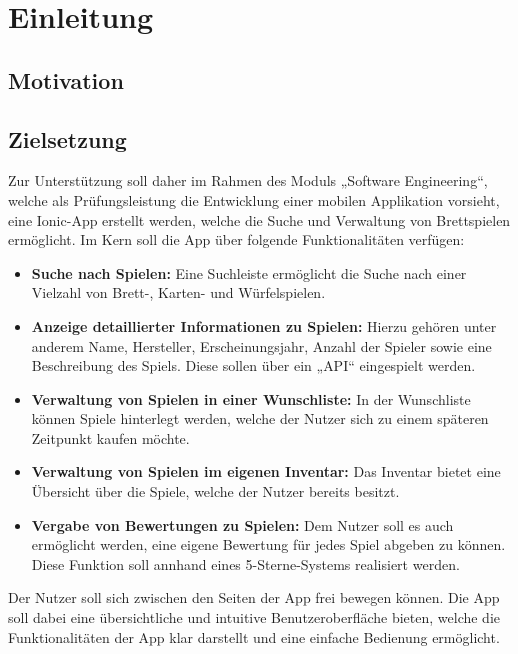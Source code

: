 \chapter{Einleitung}
\section{Motivation}

\section{Zielsetzung}
Zur Unterstützung soll daher im Rahmen des Moduls „Software Engineering“, welche als Prüfungsleistung die Entwicklung einer mobilen Applikation vorsieht,
eine Ionic-App erstellt werden, welche die Suche und Verwaltung von Brettspielen ermöglicht. Im Kern soll die App über folgende
Funktionalitäten verfügen:
\begin{itemize}
    \item \textbf{Suche nach Spielen:} Eine Suchleiste ermöglicht die Suche nach einer Vielzahl von Brett-, Karten- und Würfelspielen. 
    \item \textbf{Anzeige detaillierter Informationen zu Spielen:} Hierzu gehören unter anderem Name, Hersteller, Erscheinungsjahr, Anzahl der Spieler sowie eine Beschreibung des Spiels. Diese sollen über ein „\ac{API}“ eingespielt werden.
    \item \textbf{Verwaltung von Spielen in einer Wunschliste:} In der Wunschliste können Spiele hinterlegt werden, welche der Nutzer sich zu einem späteren Zeitpunkt kaufen möchte.
    \item \textbf{Verwaltung von Spielen im eigenen Inventar:} Das Inventar bietet eine Übersicht über die Spiele, welche der Nutzer bereits besitzt.
    \item \textbf{Vergabe von Bewertungen zu Spielen:} Dem Nutzer soll es auch ermöglicht werden, eine eigene Bewertung für jedes Spiel abgeben zu können. Diese Funktion soll annhand eines 5-Sterne-Systems realisiert werden.
\end{itemize}
Der Nutzer soll sich zwischen den Seiten der App frei bewegen können. Die App soll dabei eine übersichtliche und intuitive Benutzeroberfläche bieten, welche die Funktionalitäten der App klar darstellt und eine einfache Bedienung ermöglicht.
